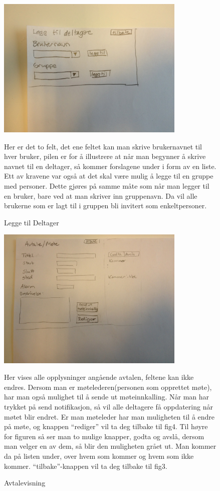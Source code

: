 \newpage

\begin{figure}[ht!]
\includegraphics[width=90mm]{fig6.jpg}
\caption{ Legge til Deltager}
Her er det to felt, det ene feltet kan man skrive brukernavnet til hver bruker, pilen er for å illustrere at når man begynner å skrive navnet til en deltager, så kommer forslagene under i form av en liste. Ett av kravene var også at det skal være mulig å legge til en gruppe med personer. Dette gjøres på samme måte som når man legger til en bruker, bare ved at man skriver inn gruppenavn. Da vil alle brukerne som er lagt til i gruppen bli invitert som enkeltpersoner.
\end{figure}

\newpage
\begin{figure}[ht!]
\includegraphics[width=90mm]{fig7.jpg}
\caption{Avtalevisning}
Her vises alle opplysninger angående avtalen, feltene kan ikke endres. Dersom man er møtelederen(personen som opprettet møte), har man også mulighet til å sende ut møteinnkalling. Når man har trykket på send notifikasjon, så vil alle deltagere få oppdatering når møtet blir endret. Er man møteleder har man muligheten til å endre på møte, og knappen “rediger” vil ta deg tilbake til fig4. Til høyre for figuren så ser man to mulige knapper, godta og avslå, dersom man velger en av dem, så blir den muligheten grået ut. Man kommer da på listen under, over hvem som kommer og hvem som ikke kommer. “tilbake”-knappen vil ta deg tilbake til fig3.
\end{figure}